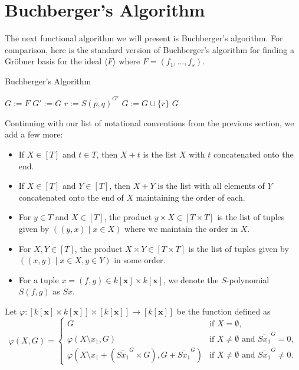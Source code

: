 \documentclass[MS, xcolor=dvipsnames]{wfuthesis}
\def\and{\text{ and }}
\theoremstyle{definition}
\def\p{\varphi}
\begin{document}

\section{Buchberger's Algorithm}
The next functional algorithm we will present is Buchberger's algorithm. For comparison, here is the standard version of Buchberger's algorithm for finding a Gr\"obner basis for the ideal $\langle F \rangle$ where $F = (f_1,\dots,f_s)$. \par
\begin{algorithm}
  \caption{Buchberger's Algorithm}
  \begin{algorithmic}
    \State $G:=F$
    \Repeat
      \State $G' := G$
        \State $r := \overline{S(p,q)}^{G'}$
          \State $G := G \cup \{r\}$
        \EndIf
      \EndFor
    \State \Return $G$
  \end{algorithmic}
\end{algorithm}
Continuing with our list of notational conventions from the previous section, we add a few more:
\begin{itemize}
  \item If $X \in [T]$ and $t \in T$, then $X + t$ is the list $X$ with $t$ concatenated onto the end.
  \item If $X \in [T]$ and $Y \in [T]$, then $X + Y$ is the list with all elements of $Y$ concatenated onto the end of $X$ maintaining the order of each.
  \item For $y \in T$ and $X \in [T]$, the product $y \times X \in [T \times T]$ is the list of tuples given by $((y,x) \mid x \in X)$ where we maintain the order in $X$.
  \item For $X,Y \in [T]$, the product $X \times Y \in [T \times T]$ is the list of tuples given by $((x,y) \mid x \in X, y \in Y)$ in some order.
  \item For a tuple $x = (f,g) \in k[\mathbf x] \times k[\mathbf x]$, we denote the $S$-polynomial $S(f,g)$ as $Sx$.
\end{itemize}
Let $\p: [k[\mathbf x] \times k[\mathbf x]] \times [k[\mathbf x]] \to [k[\mathbf x]]$ be the function defined as
\[ \p(X,G) = \begin{cases} G &\text{if } X = \emptyset, \\ \p(X \setminus x_1,G) &\text{if } X \ne \emptyset \and \overline{Sx_1}^{G} = 0, \\ \p\left(X \setminus x_1 + (\overline{Sx_1}^{G} \times G),G + \overline{Sx_1}^{G}\right) &\text{if } X \ne \emptyset \and \overline{Sx_1}^{G} \ne 0. \end{cases} \]
\end{document}
